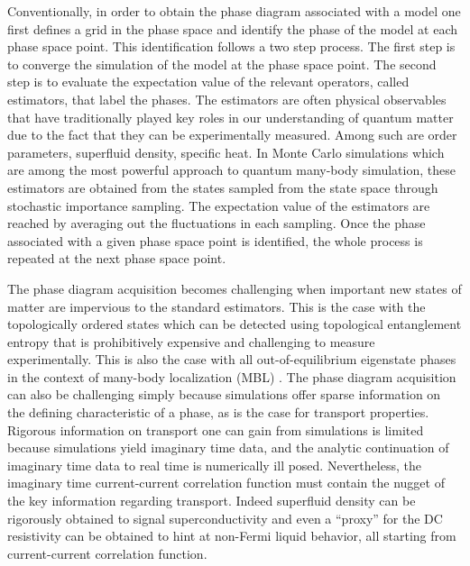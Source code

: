 \documentclass[aps,prb,floatfix,amsmath,amssymb,amsfonts,10pt,floatfix,longbibliography]{revtex4-1}
\begin{document}
Conventionally, in order to obtain the phase diagram associated with a model one first defines a grid in the phase space and identify the phase of the model at each phase space point. This identification follows a two step process. The first step is to converge the simulation of the model at the phase space point. The second step is to evaluate the expectation value of the relevant operators, called estimators, that label the phases. The estimators are often physical observables that have traditionally played key roles in our understanding of quantum matter due to the fact that they can be experimentally measured. Among such are order parameters, superfluid density, specific heat. In Monte Carlo simulations which are among the most powerful approach to quantum many-body simulation, these estimators are obtained from the states sampled from the state space through stochastic importance sampling. The expectation value of the estimators are reached by averaging out the fluctuations in each sampling. Once the phase associated with a given phase space point is identified, the whole process is repeated at the next phase space point. 

The phase diagram acquisition becomes challenging when important new states of matter are impervious to the standard estimators. This is the case with the topologically ordered states\cite{Wen1990IJMPB} which can be detected using topological entanglement entropy\cite{Levin2006,Kitaev2006} that is prohibitively expensive and challenging to measure experimentally\cite{Islam2015}. This is also the case with all out-of-equilibrium eigenstate phases\cite{Huse13, PekkerHilbertGlass} in the context of many-body localization (MBL) \cite{Anderson58, Basko06, PalHuse,  OganesyanHuse,  AltmanVosk}. The phase diagram acquisition can also be challenging simply because simulations offer sparse information on the defining characteristic of a phase, as is the case for transport properties. 
Rigorous information on transport one can gain from simulations is limited because simulations yield imaginary time data, and the analytic continuation of imaginary time data to real time is numerically ill posed. Nevertheless, the imaginary time current-current correlation function must contain the nugget of the key information regarding transport. Indeed 
superfluid density can be rigorously obtained to signal superconductivity\cite{Scalapino1993} and even a “proxy” for the DC resistivity can be obtained to hint at non-Fermi liquid behavior\cite{Lederer2017}, all starting from current-current correlation function. 
\end{document}
